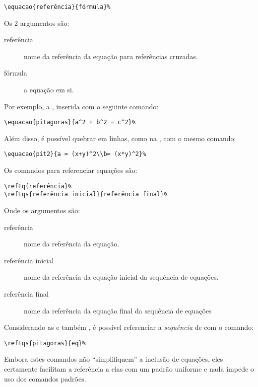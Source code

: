 \begin{verbatim}
\equacao{referência}{fórmula}%
\end{verbatim}

Os 2 argumentos são:
\begin{description}
\item[referência] nome da referência da equação para referências cruzadas.
\item[fórmula] a equação em si.
\end{description} 

Por exemplo, a , inserida com o seguinte comando:
\begin{verbatim}
\equacao{pitagoras}{a^2 + b^2 = c^2}%
\end{verbatim}

%

Além disso, é possível quebrar em linhas, como na , com o mesmo comando:
\begin{verbatim}
\equacao{pit2}{a = (x+y)^2\\b= (x*y)^2}%
\end{verbatim}

%

Os comandos para referenciar equações são:

\begin{verbatim}
\refEq{referência}%
\refEqs{referência inicial}{referência final}%
\end{verbatim}

Onde os argumentos são:
\begin{description}
\item[referência] nome da referência da equação.
\item[referência inicial] nome da referência da equação inicial da sequência de equações.
\item[referência final] nome da referência da equação final da sequência de equações
\end{description}

Considerando as  e também , é possível referenciar 
a \emph{sequência} de  com o comando:
\begin{verbatim}
\refEqs{pitagoras}{eq}%
\end{verbatim}

Embora estes comandos não ``simplifiquem'' a inclusão de equações, eles 
certamente facilitam a referência a elas com um padrão uniforme e nada impede o 
uso dos comandos padrões.

